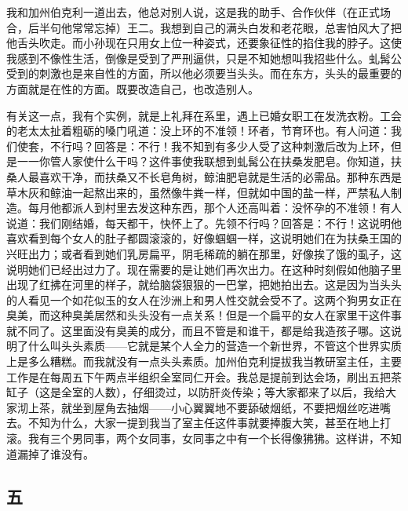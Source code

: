 我和加州伯克利一道出去，他总对别人说，这是我的助手、合作伙伴（在正式场合，后半句他常常忘掉）王二。我想到自己的满头白发和老花眼，总害怕风大了把他舌头吹走。而小孙现在只用女上位一种姿式，还要象征性的掐住我的脖子。这使我感到不像性生活，倒像是受到了严刑逼供，只是不知她想叫我招些什么。虬髯公受到的刺激也是来自性的方面，所以他必须要当头头。而在东方，头头的最重要的方面就是在性的方面。既要改造自己，也改造别人。 

有关这一点，我有个实例，就是上礼拜在系里，遇上已婚女职工在发洗衣粉。工会的老太太扯着粗砺的嗓门吼道：没上环的不准领！环者，节育环也。有人问道：我们使套，不行吗？回答是：不行！我不知到有多少人受了这种刺激后改为上环，但是一一你管人家使什么干吗？这件事使我联想到虬髯公在扶桑发肥皂。你知道，扶桑人最喜欢干净，而扶桑又不长皂角树，鲸油肥皂就是生活的必需品。那种东西是草木灰和鲸油一起熬出来的，虽然像牛粪一样，但就如中国的盐一样，严禁私人制造。每月他都派人到村里去发这种东西，那个人还高叫着：没怀孕的不准领！有人说道：我们刚结婚，每天都干，快怀上了。先领不行吗？回答是：不行！这说明他喜欢看到每个女人的肚子都圆滚滚的，好像蝈蝈一样，这说明她们在为扶桑王国的兴旺出力；或者看到她们乳房扁平，阴毛稀疏的躺在那里，好像挨了饿的虱子，这说明她们已经出过力了。现在需要的是让她们再次出力。在这种时刻假如他脑子里出现了红拂在河里的样子，就给脑袋狠狠的一巴掌，把她拍出去。这是因为当头头的人看见一个如花似玉的女人在沙洲上和男人性交就会受不了。这两个狗男女正在臭美，而这种臭美居然和头头没有一点关系！但是一个扁平的女人在家里干这件事就不同了。这里面没有臭美的成分，而且不管是和谁干，都是给我造孩子哪。这说明了什么叫头头素质——它就是某个人全力的营造一个新世界，不管这个世界实质上是多么糟糕。而我就没有一点头头素质。加州伯克利提拔我当教研室主任，主要工作是在每周五下午两点半组织全室同仁开会。我总是提前到达会场，刷出五把茶缸子（这是全室的人数），仔细烫过，以防肝炎传染；等大家都来了以后，我给大家沏上茶，就坐到屋角去抽烟——小心翼翼地不要舔破烟纸，不要把烟丝吃进嘴去。不知为什么，大家一提到我当了室主任这件事就要捧腹大笑，甚至在地上打滚。我有三个男同事，两个女同事，女同事之中有一个长得像狒狒。这样讲，不知道漏掉了谁没有。 

\subsection{五} 

